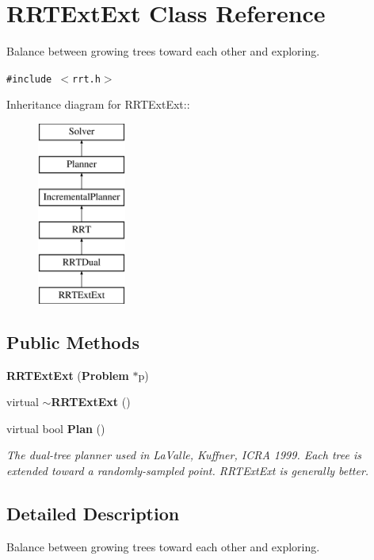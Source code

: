 \section{RRTExt\-Ext  Class Reference}
\label{classRRTExtExt}
Balance between growing trees toward each other and exploring. 


{\tt \#include $<$rrt.h$>$}

Inheritance diagram for RRTExt\-Ext::\begin{figure}[H]
\begin{center}
\leavevmode
\includegraphics[height=6cm]{classRRTExtExt}
\end{center}
\end{figure}
\subsection*{Public Methods}
\begin{CompactItemize}
\item 
{\bf RRTExt\-Ext} ({\bf Problem} $\ast$p)
\item 
virtual {\bf $\sim$RRTExt\-Ext} ()
\item 
virtual bool {\bf Plan} ()
\begin{CompactList}\small\item\em The dual-tree planner used in La\-Valle, Kuffner, ICRA 1999. Each tree is extended toward a randomly-sampled point. RRTExt\-Ext is generally better.\item\end{CompactList}\end{CompactItemize}


\subsection{Detailed Description}
Balance between growing trees toward each other and exploring.

